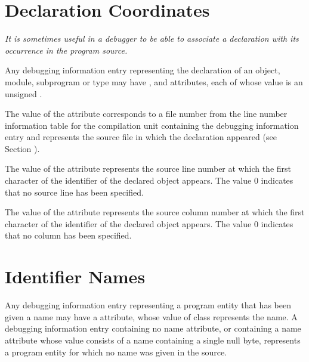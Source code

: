 \section{Declaration Coordinates}
\label{chap:declarationcoordinates}
\textit{It is sometimes useful in a debugger to be able to associate
a declaration with its occurrence in the program source.}

Any debugging information entry representing
the declaration of an object, module, subprogram or type may have
\DWATdeclfileDEFN,\hypertarget{chap:DWATdeclfilefilecontainingsourcedeclaration}{}
\DWATdecllineDEFN\hypertarget{chap:DWATdecllinelinenumberofsourcedeclaration}{}
 and
\DWATdeclcolumnDEFN\hypertarget{chap:DWATdeclcolumncolumnpositionofsourcedeclaration}{}
attributes, each of whose value is an unsigned
.

The value of
the
\DWATdeclfile{}
attribute
corresponds to
a file number from the line number information table for the
compilation unit containing the debugging information entry and
represents the source file in which the declaration appeared
(see Section ).
\db

The value of
the \DWATdeclline{} attribute represents
the source line number at which the first character of
the identifier of the declared object appears. The value 0
indicates that no source line has been specified.

The value of
the \DWATdeclcolumn{} attribute represents
the source column number at which the first character of
the identifier of the declared object appears. The value 0
indicates that no column has been specified.

\section{Identifier Names}
\label{chap:identifiernames}
Any\hypertarget{chap:DWATnamenameofdeclaration}{}
debugging information entry
representing
a program entity that has been given a name may have a
\DWATnameDEFN{}
attribute, whose value of
class \CLASSstring{} represents the name.
A debugging information entry containing
no name attribute, or containing a name attribute whose value
consists of a name containing a single null byte, represents
a program entity for which no name was given in the source.

